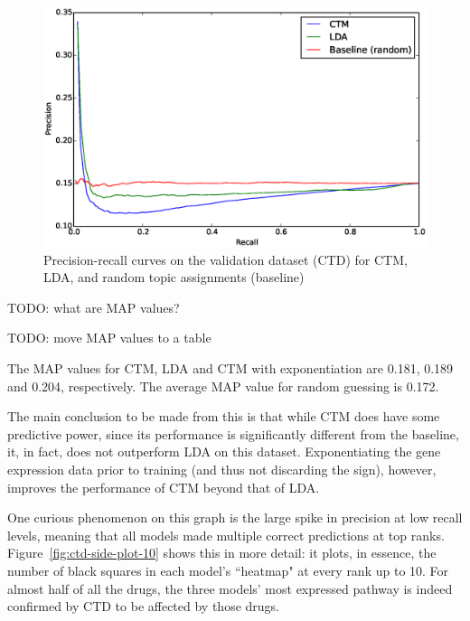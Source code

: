 \documentclass[12pt,a4paper,twoside,openright]{report}
\begin{document}
\begin{figure}[!htb]
\includegraphics[width=\textwidth]{ctd-pr-curves.eps}
\caption{Precision-recall curves on the validation dataset (CTD) for CTM, LDA, and random topic assignments (baseline)}
\label{fig:ctd-pr-curves}
\end{figure}

TODO: what are MAP values?

TODO: move MAP values to a table

The MAP values for CTM, LDA and CTM with exponentiation are 0.181, 0.189 and 0.204, respectively. The average MAP value for random guessing is 0.172.

The main conclusion to be made from this is that while CTM does have some predictive power, since its performance is significantly different from the baseline, it, in fact, does not outperform LDA on this dataset. Exponentiating the gene expression data prior to training (and thus not discarding the sign), however, improves the performance of CTM beyond that of LDA.

One curious phenomenon on this graph is the large spike in precision at low recall levels, meaning that all models made multiple correct predictions at top ranks. Figure~\ref{fig:ctd-side-plot-10} shows this in more detail: it plots, in essence, the number of black squares in each model's ``heatmap" at every rank up to 10. For almost half of all the drugs, the three models' most expressed pathway is indeed confirmed by CTD to be affected by those drugs.
\end{document}
